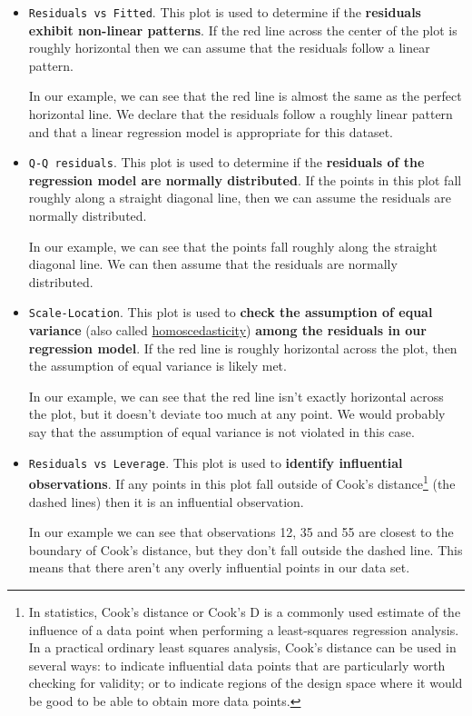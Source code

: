 \documentclass[a4paper]{article}
\begin{document}
    \begin{itemize}
        \item \textcolor{Red3}{\texttt{Residuals vs Fitted}}. This plot is used to determine if the \textbf{residuals exhibit non-linear patterns}. If the red line across the center of the plot is roughly horizontal then we can assume that the residuals follow a linear pattern.
        
        In our example, we can see that the red line is almost the same as the perfect horizontal line. We declare that the residuals follow a roughly linear pattern and that a linear regression model is appropriate for this dataset.

        \item \textcolor{Red3}{\texttt{Q-Q residuals}}. This plot is used to determine if the \textbf{residuals of the regression model are normally distributed}. If the points in this plot fall roughly along a straight diagonal line, then we can assume the residuals are normally distributed.
        
        In our example, we can see that the points fall roughly along the straight diagonal line. We can then assume that the residuals are normally distributed.

        \newpage

        \item \textcolor{Red3}{\texttt{Scale-Location}}. This plot is used to \textbf{check the assumption of equal variance} (also called \href{https://en.wikipedia.org/wiki/Homoscedasticity_and_heteroscedasticity}{homoscedasticity}) \textbf{among the residuals in our regression model}. If the red line is roughly horizontal across the plot, then the assumption of equal variance is likely met.

        In our example, we can see that the red line isn't exactly horizontal across the plot, but it doesn't deviate too much at any point. We would probably say that the assumption of equal variance is not violated in this case.

        \item \textcolor{Red3}{\texttt{Residuals vs Leverage}}. This plot is used to \textbf{identify influential observations}. If any points in this plot fall outside of Cook's distance\footnote{In statistics, Cook's distance or Cook's D is a commonly used estimate of the influence of a data point when performing a least-squares regression analysis. In a practical ordinary least squares analysis, Cook's distance can be used in several ways: to indicate influential data points that are particularly worth checking for validity; or to indicate regions of the design space where it would be good to be able to obtain more data points.} (the dashed lines) then it is an influential observation.

        In our example we can see that observations 12, 35 and 55 are closest to the boundary of Cook's distance, but they don't fall outside the dashed line. This means that there aren't any overly influential points in our data set.
    \end{itemize}
\end{document}
